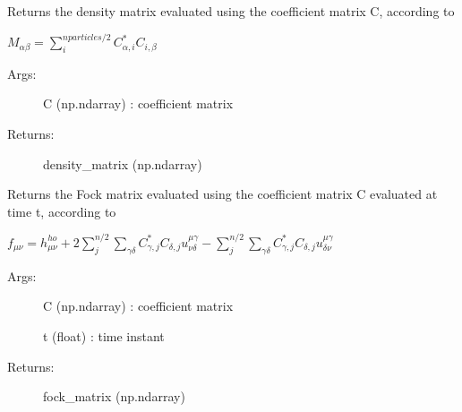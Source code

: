 \documentclass[letterpaper,10pt,english]{sphinxmanual}
\begin{document}
\begin{fulllineitems}
\begin{fulllineitems}
\end{fulllineitems}


\begin{fulllineitems}
\label{\detokenize{index:do.RHF.fill_density_matrix}}
Returns the density matrix evaluated using the coefficient matrix C, according to

\(M_{\alpha\beta} = \sum_i^{nparticles/2} C_{\alpha,i}^* C_{i,\beta}\)
\begin{description}
\item[{Args:}] \leavevmode
C (np.ndarray) : coefficient matrix

\item[{Returns:}] \leavevmode
density\_matrix (np.ndarray)

\end{description}

\end{fulllineitems}


\begin{fulllineitems}
\label{\detokenize{index:do.RHF.fill_fock_matrix}}
Returns the Fock matrix evaluated using the coefficient matrix C evaluated at time t, according to

\(f_{\mu\nu} =  h_{\mu\nu}^{ho} + 2\sum_{j}^{n/2} \sum_{\gamma\delta} C_{\gamma,j}^* C_{\delta,j} u^{\mu\gamma}_{\nu\delta} - \sum_{j}^{n/2} \sum_{\gamma\delta} C_{\gamma,j}^* C_{\delta,j} u^{\mu\gamma}_{\delta\nu}\)
\begin{description}
\item[{Args:}] \leavevmode
C (np.ndarray) : coefficient matrix

t (float) : time instant

\item[{Returns:}] \leavevmode
fock\_matrix (np.ndarray)

\end{description}

\end{fulllineitems}


\end{fulllineitems}
\end{document}
